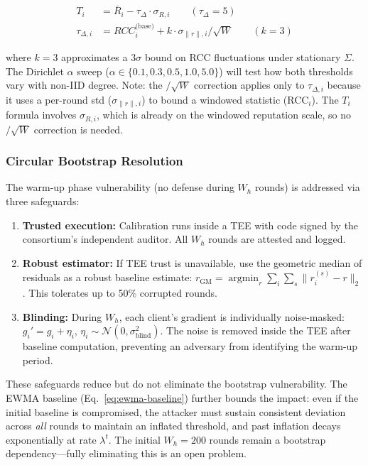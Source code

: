 \documentclass[10pt,journal]{IEEEtran}
\begin{document}
\begin{align}
T_i &= \bar{R}_i - \tau_\Delta \cdot \sigma_{R,i} \qquad (\tau_\Delta = 5) \label{eq:thresh-rep}\\
\tau_{\Delta,i} &= RCC_i^{\text{(base)}} + k \cdot \sigma_{\|r\|,i} / \sqrt{W} \qquad (k = 3) \label{eq:thresh-rcc}
\end{align}

where $k=3$ approximates a $3\sigma$ bound on RCC fluctuations under stationary $\Sigma$. The Dirichlet $\alpha$ sweep ($\alpha \in \{0.1, 0.3, 0.5, 1.0, 5.0\}$) will test how both thresholds vary with non-IID degree. Note: the $/\sqrt{W}$ correction applies only to $\tau_{\Delta,i}$ because it uses a per-round std ($\sigma_{\|r\|,i}$) to bound a windowed statistic (RCC$_i$). The $T_i$ formula involves $\sigma_{R,i}$, which is already on the windowed reputation scale, so no $/\sqrt{W}$ correction is needed.

\subsubsection{Circular Bootstrap Resolution}

The warm-up phase vulnerability (no defense during $W_h$ rounds) is addressed via three safeguards:

\begin{enumerate}
  \item \textbf{Trusted execution:} Calibration runs inside a TEE with code signed by the consortium's independent auditor. All $W_h$ rounds are attested and logged.
  \item \textbf{Robust estimator:} If TEE trust is unavailable, use the geometric median of residuals as a robust baseline estimate: $r_{\text{GM}} = \operatorname{argmin}_r \sum_i \sum_s \|r_i^{(s)} - r\|_2$. This tolerates up to 50\% corrupted rounds.
  \item \textbf{Blinding:} During $W_h$, each client's gradient is individually noise-masked: $g_i' = g_i + \eta_i$, $\eta_i \sim \mathcal{N}(0, \sigma_{\text{blind}}^2)$. The noise is removed inside the TEE after baseline computation, preventing an adversary from identifying the warm-up period.
\end{enumerate}

These safeguards reduce but do not eliminate the bootstrap vulnerability. The EWMA baseline (Eq.~\ref{eq:ewma-baseline}) further bounds the impact: even if the initial baseline is compromised, the attacker must sustain consistent deviation across \textit{all} rounds to maintain an inflated threshold, and past inflation decays exponentially at rate $\lambda^t$. The initial $W_h = 200$ rounds remain a bootstrap dependency---fully eliminating this is an open problem.
\end{document}
